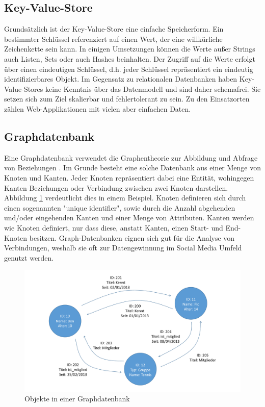 \subsection{Key-Value-Store}
\label{ch:grundlagen:sec:NoSQL:KeyValueStore}

Grundsätzlich ist der Key-Value-Store eine einfache Speicherform. Ein bestimmter Schlüssel referenziert auf einen Wert, der eine willkürliche Zeichenkette sein kann. In einigen Umsetzungen können die Werte außer Strings auch Listen, Sets oder auch Hashes beinhalten. Der Zugriff auf die Werte erfolgt über einen eindeutigen Schlüssel, d.h. jeder Schlüssel repräsentiert ein eindeutig identifizierbares Objekt. Im Gegensatz zu relationalen Datenbanken haben Key-Value-Stores keine Kenntnis über das Datenmodell und sind daher schemafrei. Sie setzen sich zum Ziel skalierbar und fehlertolerant zu sein. Zu den Einsatzorten zählen Web-Applikationen mit vielen aber einfachen Daten.

\subsection{Graphdatenbank}
\label{ch:grundlagen:sec:NoSQL:GraphDatenbanken}

Eine Graphdatenbank verwendet die Graphentheorie zur Abbildung und Abfrage von Beziehungen \cite{SWB-386976589}. Im Grunde besteht eine solche Datenbank aus einer Menge von Knoten und Kanten. Jeder Knoten repräsentiert dabei eine Entität, wohingegen Kanten Beziehungen oder Verbindung zwischen zwei Knoten darstellen. Abbildung \ref{graph_database} verdeutlicht dies in einem Beispiel. Knoten definieren sich durch einen sogenannten "unique identifier", sowie durch die Anzahl abgehenden und/oder eingehenden Kanten und einer Menge von Attributen. Kanten werden wie Knoten definiert, nur dass diese, anstatt Kanten, einen Start- und End-Knoten besitzen. Graph-Datenbanken eignen sich gut für die Analyse von Verbindungen, weshalb sie oft zur Datengewinnung im Social Media Umfeld genutzt werden.

\begin{figure}[htbp]
	\centering
  \includegraphics[width=1.0\textwidth, width=1.0\textwidth]{pics/graphdatabase.pdf}
	\caption{Objekte in einer Graphdatenbank}
	\label{graph_database}
\end{figure}

